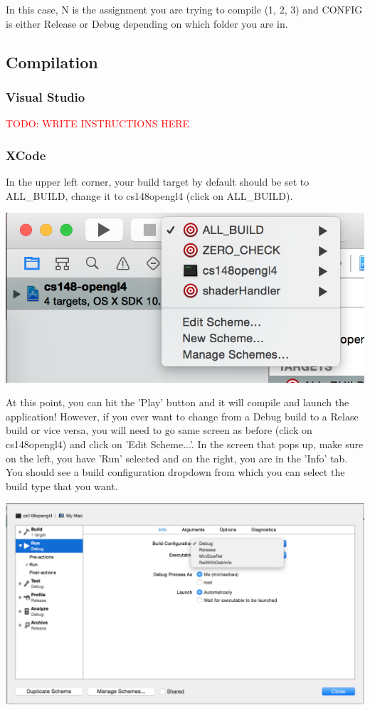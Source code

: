 \documentclass{article}
\begin{document}
In this case, N is the assignment you are trying to compile (1, 2, 3) and CONFIG is either Release or Debug depending on which folder you are in.

\subsection*{Compilation}

\subsubsection*{Visual Studio}

\textcolor{red}{TODO: WRITE INSTRUCTIONS HERE}

\subsubsection*{XCode}

In the upper left corner, your build target by default should be set to ALL\_BUILD, change it to cs148opengl4 (click on ALL\_BUILD).

\includegraphics[]{xcode1.png}

At this point, you can hit the 'Play' button and it will compile and launch the application! However, if you ever want to change from a Debug build to a Relase build or vice versa, you will need to go same screen as before (click on cs148opengl4) and click on 'Edit Scheme...'. In the screen that pops up, make sure on the left, you have 'Run' selected and on the right, you are in the 'Info' tab. You should see a build configuration dropdown from which you can select the build type that you want.

\includegraphics[width=\linewidth]{xcode2.png}
\end{document}
